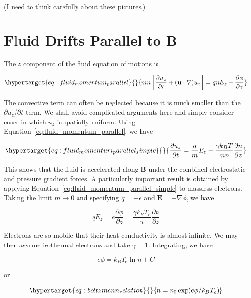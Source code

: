 \documentclass[
  notoc %
]{tufte-book}
\begin{document}
(I need to think carefully about these pictures.)

\hypertarget{fluid-drifts-parallel-to-b}{%
\section{Fluid Drifts Parallel to B}\label{fluid-drifts-parallel-to-b}}

The \(z\) component of the fluid equation of motions is

\begin{equation}\protect\hypertarget{eq:fluid_momentum_parallel}{}{
mn\left[ \frac{\partial u_z}{\partial t} + (\mathbf{u}\cdot\nabla)u_z\right] = qn E_z - \frac{\partial\phi}{\partial z}
}\label{eq:fluid_momentum_parallel}\end{equation}

The convective term can often be neglected because it is much smaller
than the \(\partial u_z/\partial t\) term. We shall avoid complicated
arguments here and simply consider cases in which \(u_z\) is spatially
uniform. Using Equation~\ref{eq:fluid_momentum_parallel}, we have

\begin{equation}\protect\hypertarget{eq:fluid_momentum_parallel_simple}{}{
\frac{\partial u_z}{\partial t} = \frac{q}{m}E_z - \frac{\gamma k_B T}{mn}\frac{\partial n}{\partial z}
}\label{eq:fluid_momentum_parallel_simple}\end{equation}

This shows that the fluid is accelerated along \(\mathbf{B}\) under the
combined electrostatic and pressure gradient forces. A particularly
important result is obtained by applying
Equation~\ref{eq:fluid_momentum_parallel_simple} to massless electrons.
Taking the limit \(m\rightarrow 0\) and specifying \(q=-e\) and
\(\mathbf{E}=-\nabla\phi\), we have

\[
qE_z = e\frac{\partial\phi}{\partial z} = \frac{\gamma k_B T_e}{n}\frac{\partial n}{\partial z}
\]

Electrons are so mobile that their heat conductivity is almost infinite.
We may then assume isothermal electrons and take \(\gamma = 1\).
Integrating, we have

\[
e\phi = k_B T_e \ln n + C
\]

or

\begin{equation}\protect\hypertarget{eq:boltzmann_relation}{}{
n = n_0 \exp(e\phi/k_B T_e)
}\label{eq:boltzmann_relation}\end{equation}
\end{document}
